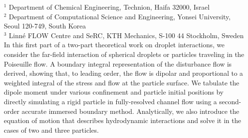 %
%
%
%
%
%
%
\paperaffiliation
{%
  $^1$ Department of Chemical Engineering, Technion, Haifa 32000, Israel\\%
  $^2$ Department of Computational Science and Engineering, Yonsei University, \\Seoul 120-749, South Korea\\%
  $^3$ Linn\'e FLOW Centre and SeRC, KTH Mechanics, S-100 44 Stockholm, Sweden%
}%
%
%
%
%
%
%
\paperpages{}%
%
%
%
\papersummary%
{%
   In this first part of a two-part theoretical work on droplet interactions,
   we consider the far-field interaction of spherical droplets or particles traveling in the Poiseuille flow.
   A boundary integral representation of the disturbance flow is derived,
   showing that, to leading order, the flow is dipolar and proportional to a weighted integral of the stress and flow at the particle surface.
   We tabulate the dipole moment under various confinement and particle initial positions by directly simulating a rigid particle in fully-resolved channel flow
   using a second-order accurate immersed boundary method.
   Analytically, we also introduce the equation of motion that describes hydrodynamic interactions and solve it in the cases of two and three particles. 
}%
%
\graphicspath{{paper3/}}%
%
%
%
